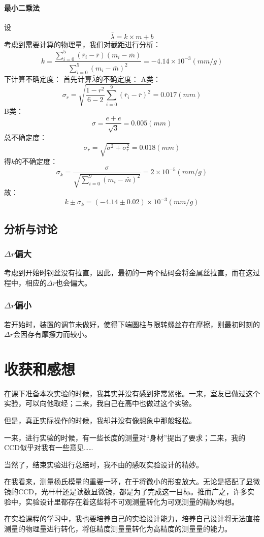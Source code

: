 \documentclass{ctexart}
\begin{document}
\paragraph{最小二乘法}
设$$\bar{\lambda}=k\times m+b$$
考虑到需要计算的物理量，我们对截距进行分析：
$$k=\frac{\sum\limits_{i=0}^5{(\bar{r}_i-\bar{r})(m_i-\bar{m})}}{\sum\limits_{i=0}^5{(m_i-\bar{m})^2}}=-4.14\times 10^{-3}(mm/g)$$
下计算不确定度：
首先计算$\bar{\lambda}$的不确定度：
A类：$$\sigma_r =\sqrt{\frac{1-r^2}{6-2}\sum\limits_{i=0}^9{(\bar{r}_i-\bar{r})^2}}=0.017(mm)$$
B类：$$\sigma=\frac{e+e}{\sqrt{3}}=0.005(mm)$$
总不确定度：$$\sigma_{\bar{r}}=\sqrt{\sigma^2+\sigma_r^2}=0.018(mm)$$
得$k$的不确定度：
$$\sigma_k=\frac{\sigma}{\sqrt{\sum\limits_{i=0}^9{(m_i-\bar{m})^2}}}=2\times10^{-5}(mm/g)$$
故：
$$k\pm \sigma_k=(-4.14\pm 0.02 )\times 10^{-3}(mm/g)$$
\subsection{分析与讨论}
\subsubsection{$\Delta r$偏大}考虑到开始时钢丝没有拉直，因此，最初的一两个砝码会将金属丝拉直，而在这过程中，相应的$\Delta r$也会偏大。
\subsubsection{$\Delta r$偏小}若开始时，装置的调节未做好，使得下端圆柱与限转螺丝存在摩擦，则最初时刻的$\Delta r$会因存有摩擦力而较小。
\section{收获和感想}
在课下准备本次实验的时候，我其实并没有感到非常紧张。一来，室友已做过这个实验，可以向他取经；二来，我自己在高中也做过这个实验。

但是，真正实际操作的时候，我却并没有像想象中那般轻松。

一来，进行实验的时候，有一些长度的测量对“身材”提出了要求；二来，我的CCD似乎对我有一些意见……

当然了，结束实验进行总结时，我不由的感叹实验设计的精妙。

在我看来，测量杨氏模量的重要一环，在于将微小的形变放大。无论是搭配了显微镜的CCD，光杆杆还是读数显微镜，都是为了完成这一目标。推而广之，许多实验中，实验设计里都存在着这些将不可观测量转化为可观测量的精妙构想。

在实验课程的学习中，我也要培养自己的实验设计能力，培养自己设计将无法直接测量的物理量进行转化，将低精度测量量转化为高精度的测量量的能力。
    
\end{document}
